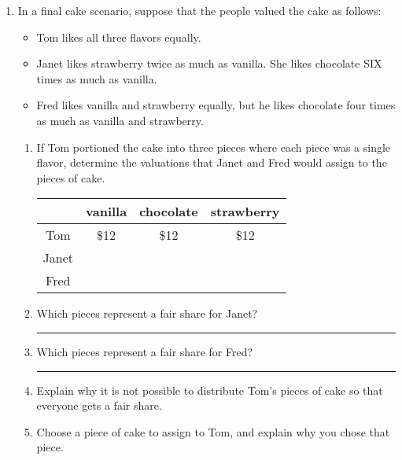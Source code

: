 \documentclass[12pt]{article}
\newcommand{\ans}[1][1in]{\rule{#1}{.5pt}}
\begin{document}
\begin{enumerate}
\begin{enumerate}
\vfill

\end{enumerate}


\newpage

\item In a final cake scenario, suppose that the people valued the cake as follows:

\begin{itemize}
\item Tom likes all three flavors equally.
\item Janet likes strawberry twice as much as vanilla. She likes chocolate SIX times as much as vanilla.
\item Fred  likes vanilla and strawberry equally, but he likes chocolate four times as much as vanilla and strawberry.
\end{itemize}

\begin{enumerate}

\item If Tom portioned the cake into three pieces where each piece was a single flavor, determine the valuations that Janet and Fred would assign to the pieces of cake.

\begin{center}
{  %
\renewcommand{\arraystretch}{1.6} 
\begin{tabular}{| c | c | c | c |}
\hline
& vanilla& chocolate  & strawberry \\ \hline \hline
Tom & \$12 & \$12 & \$12 \\ \hline
Janet&  &  &  \\ \hline%
Fred& & &  \\%
\hline
\end{tabular}
}
\end{center}

\item Which pieces represent a fair share  for Janet? \ans[2in]
\item Which pieces represent a fair share  for Fred? \ans[2in]
\item Explain why it is not possible to distribute Tom's pieces of cake so that everyone gets a fair share.

\vfill

\item Choose a piece of cake to assign to Tom, and explain why you chose that piece.

\vfill


\end{enumerate}
\end{enumerate}
\end{document}
